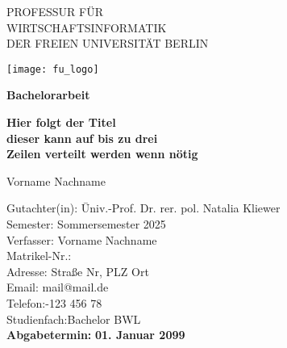 \thispagestyle{empty}

\begin{center}

\vspace*{-10mm}

{\LARGE PROFESSUR FÜR \\WIRTSCHAFTSINFORMATIK\\[1mm]}
DER FREIEN UNIVERSITÄT BERLIN\\

\vspace*{1cm}

\texttt{[image: fu\_logo]}

\vspace*{1cm}

{\Large \textbf{Bachelorarbeit}}\\ 

\vspace{1cm}

{\Large \textbf{Hier folgt der Titel}}\\ 
\vspace*{1mm}
{\Large \textbf{dieser kann auf bis zu drei}}\\ 
\vspace*{1mm}
{\Large \textbf{Zeilen verteilt werden wenn nötig}}\\

\vspace{1.5cm}

{\LARGE Vorname Nachname}\\[15mm]

\parbox{120mm}{
\begin{large}
\begin{tabbing}
Gutachter(in): \hspace{.7cm} \=Univ.-Prof. Dr. rer. pol. Natalia Kliewer\\[4mm]
Semester:\> Sommersemester 2025\\
Verfasser:\> Vorname Nachname\\ %
Matrikel-Nr.:\\
Adresse:\> Straße Nr, PLZ Ort\\
Email:\> mail@mail.de\\
Telefon:-123 456 78\\
Studienfach:\>Bachelor BWL\\[8mm]
\textbf{Abgabetermin:} \> \textbf{01. Januar 2099}\\
\end{tabbing}
\end{large}
}

\end{center}
\clearpage{\pagestyle{empty}\cleardoublepage}
